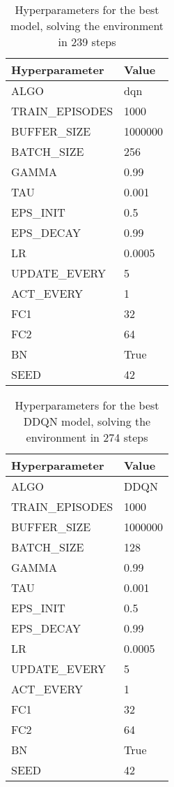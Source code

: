 \documentclass{article}
\begin{document}
\begin{table}[h!]
\centering
\begin{tabular}{ll}
\toprule
           Hyperparameter &      Value \\
\midrule
           ALGO &      dqn \\
 TRAIN\_EPISODES &     1000 \\
    BUFFER\_SIZE &  1000000 \\
     BATCH\_SIZE &      256 \\
          GAMMA &     0.99 \\
            TAU &    0.001 \\
       EPS\_INIT &      0.5 \\
      EPS\_DECAY &     0.99 \\
             LR &   0.0005 \\
   UPDATE\_EVERY &        5 \\
      ACT\_EVERY &        1 \\
            FC1 &       32 \\
            FC2 &       64 \\
             BN &     True \\
           SEED &       42 \\
\bottomrule
\end{tabular}
\label{table:res_basecase}
\caption{Hyperparameters for the best model, solving the environment in 239 steps}
\end{table}

\begin{table}[h!]
\centering
\begin{tabular}{ll}
\toprule
           Hyperparameter &      Value \\
\midrule
ALGO &     DDQN \\
 TRAIN\_EPISODES &     1000 \\
    BUFFER\_SIZE &  1000000 \\
     BATCH\_SIZE &      128 \\
          GAMMA &     0.99 \\
            TAU &    0.001 \\
       EPS\_INIT &      0.5 \\
      EPS\_DECAY &     0.99 \\
             LR &   0.0005 \\
   UPDATE\_EVERY &        5 \\
      ACT\_EVERY &        1 \\
            FC1 &       32 \\
            FC2 &       64 \\
             BN &     True \\
           SEED &       42 \\
\bottomrule
\end{tabular}
\label{table:res_basecase}
\caption{Hyperparameters for the best DDQN model, solving the environment in 274 steps}
\end{table}
\end{document}

